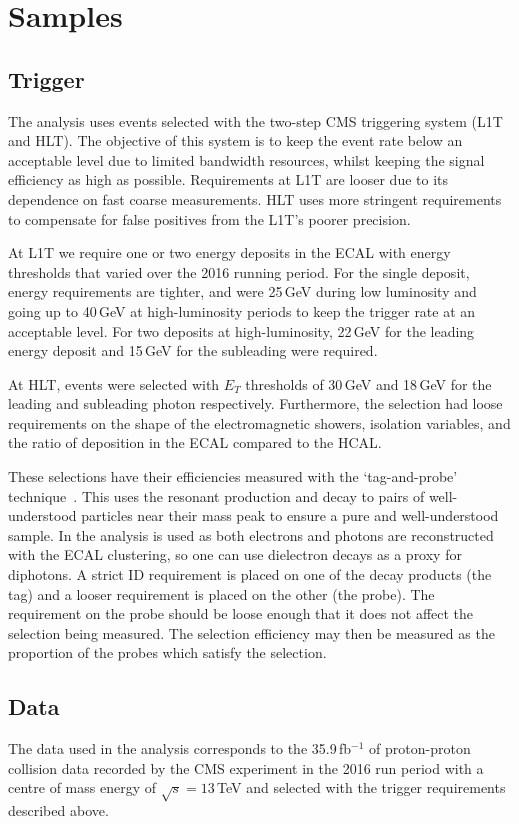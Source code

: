 \section{Samples}

\subsection{Trigger}
The analysis uses events selected with the two-step CMS triggering system (L1T and HLT). The objective of this system is to keep the event rate below an acceptable level due to limited bandwidth resources, whilst keeping the signal efficiency as high as possible. Requirements at L1T are looser due to its dependence on fast coarse measurements. HLT uses more stringent requirements to compensate for false positives from the L1T's poorer precision.

At L1T we require one or two energy deposits in the ECAL with energy thresholds that varied over the 2016 running period. For the single deposit, energy requirements are tighter, and were 25\,GeV during low luminosity and going up to 40\,GeV at high-luminosity periods to keep the trigger rate at an acceptable level. For two deposits at high-luminosity, 22\,GeV for the leading energy deposit and 15\,GeV for the subleading were required. 

At HLT, events were selected with $E_{T}$ thresholds of 30\,GeV and 18\,GeV for the leading and subleading photon respectively. 
Furthermore, the selection had loose requirements on the shape of the electromagnetic showers, isolation variables, and the ratio of deposition in the ECAL compared to the HCAL. 

These selections have their efficiencies measured with the `tag-and-probe' technique~\cite{TagAndProbe}. 
This uses the resonant production and decay to pairs of well-understood particles near their mass peak to ensure a pure and well-understood sample. 
In the \Hgg analysis \Zee is used as both electrons and photons are reconstructed with the ECAL clustering, so one can use dielectron decays as a proxy for diphotons. 
A strict ID requirement is placed on one of the decay products (the tag) and a looser requirement is placed on the other (the probe). 
The requirement on the probe should be loose enough that it does not affect the selection being measured. The selection efficiency may then be measured as the proportion of the probes which satisfy the selection.


\subsection{Data}
The data used in the analysis corresponds to the 35.9\,fb$^{-1}$ of proton-proton collision data recorded by the CMS experiment in the 2016 run period with a centre of mass energy of $\sqrt{s}=13$\,TeV and selected with the trigger requirements described above. 



